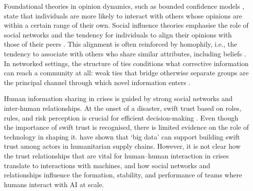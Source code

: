 \documentclass[pdflatex,sn-basic]{sn-jnl}
\begin{document}
Foundational theories in opinion dynamics, such as bounded confidence models \citep{hegselmann2002opinion}, state that individuals are more likely to interact with others whose opinions are within a certain range of their own. Social influence theories emphasise the role of social networks and the tendency for individuals to align their opinions with those of their peers \citep{friedkin1999social}. This alignment is often reinforced by homophily, i.e., the tendency to associate with others who share similar attributes, including beliefs \citep{mcpherson2001birds}. In networked settings, the structure of ties conditions what corrective information can reach a community at all: weak ties that bridge otherwise separate groups are the principal channel through which novel information enters \citep{granovetter1973strength}.

Human information sharing in crises is guided by strong social networks and inter-human relationships. At the onset of a disaster, swift trust based on roles, rules, and risk perception is crucial for efficient decision-making \citep{tatham2010application}. Even though the importance of swift trust is recognised, there is limited evidence on the role of technology in shaping it. \citet{dubey2018big} have shown that `big data' can support building swift trust among actors in humanitarian supply chains. However, it is not clear how the trust relationships that are vital for human--human interaction in crises translate to interactions with machines, and how social networks and relationships influence the formation, stability, and performance of teams where humans interact with AI at scale.
\end{document}
